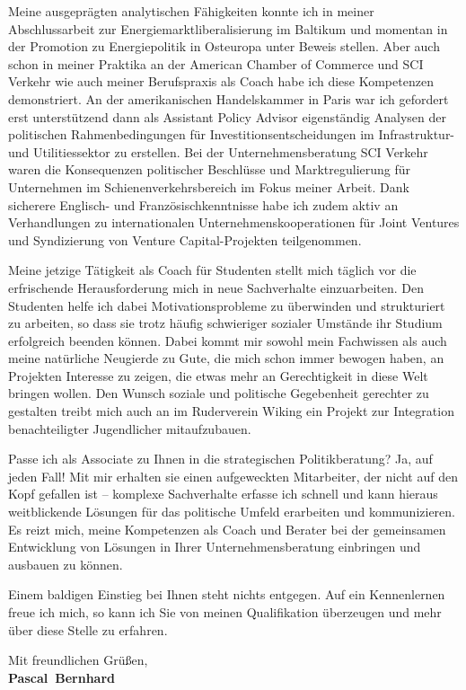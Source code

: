\documentclass[11pt,a4paper]{article}
\def\firstname{Pascal}
\def\familyname{Bernhard}
\begin{document}
Meine ausgeprägten analytischen Fähigkeiten konnte ich in meiner Abschlussarbeit zur Energiemarktliberalisierung im Baltikum und momentan in der Promotion zu Energiepolitik in Osteuropa unter Beweis stellen. Aber auch schon in meiner Praktika an der American Chamber of Commerce und SCI Verkehr wie auch meiner Berufspraxis als Coach habe ich diese Kompetenzen demonstriert. An der amerikanischen Handelskammer in Paris war ich gefordert erst unterstützend dann als Assistant Policy Advisor eigenständig Analysen der politischen Rahmenbedingungen für Investitionsentscheidungen im Infrastruktur- und Utilitiessektor zu erstellen. Bei der Unternehmensberatung SCI Verkehr waren die Konsequenzen politischer Beschlüsse und Marktregulierung für Unternehmen im Schienenverkehrsbereich im Fokus meiner Arbeit. Dank sicherere Englisch- und Französischkenntnisse habe ich zudem aktiv an Verhandlungen zu internationalen Unternehmenskooperationen für Joint Ventures und Syndizierung von Venture Capital-Projekten teilgenommen.

Meine jetzige Tätigkeit als Coach für Studenten stellt mich täglich vor die erfrischende Herausforderung mich in neue Sachverhalte einzuarbeiten. Den Studenten helfe ich dabei Motivationsprobleme zu überwinden und strukturiert zu arbeiten, so dass sie trotz häufig schwieriger sozialer Umstände ihr Studium erfolgreich beenden können. Dabei kommt mir sowohl mein Fachwissen als auch meine natürliche Neugierde zu Gute, die mich schon immer bewogen haben, an Projekten Interesse zu zeigen, die etwas mehr an Gerechtigkeit in diese Welt bringen wollen. Den Wunsch soziale und politische Gegebenheit gerechter zu gestalten treibt mich auch an im Ruderverein Wiking ein Projekt zur Integration benachteiligter Jugendlicher mitaufzubauen.

Passe ich als Associate zu Ihnen in die strategischen Politikberatung? Ja, auf jeden Fall! Mit mir erhalten sie einen aufgeweckten Mitarbeiter, der nicht auf den Kopf gefallen ist -- komplexe Sachverhalte erfasse ich schnell und kann hieraus weitblickende Lösungen für das politische Umfeld erarbeiten und kommunizieren. Es reizt mich, meine Kompetenzen als Coach und Berater bei der gemeinsamen Entwicklung von Lösungen in Ihrer Unternehmensberatung einbringen und ausbauen zu können.


Einem baldigen Einstieg bei Ihnen steht nichts entgegen. Auf ein Kennenlernen freue ich mich, so kann ich Sie von meinen Qualifikation überzeugen und mehr über diese Stelle zu erfahren.


Mit freundlichen Grüßen,\\[2em] 
%
{\bfseries \firstname~\familyname}\\
%
\end{document}
